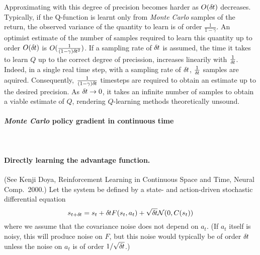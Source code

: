 Approximating with this degree of precision becomes harder as $O (\delta\hspace{-.06em}t)$
decreases. Typically, if the Q-function is learnt only from \emph{Monte Carlo} samples
of the return, the observed variance of the quantity to learn is of order
$\frac{1}{1 - \gamma}$. An optimist estimate of the number of
samples required to learn this quantity up to order $O (\delta\hspace{-.06em}t)$ is 
$O (\frac{1}{(1 - \gamma) \delta\hspace{-.06em}t^2})$. If a sampling rate of $\delta\hspace{-.06em}t$ is
assumed, the time it takes to learn $Q$ up to the correct degree of precission,
increases linearily with $\frac{1}{\delta\hspace{-.06em}t}$. Indeed, in a single real time step, with a
sampling rate of $\delta\hspace{-.06em}t$, $\frac{1}{\delta\hspace{-.06em}t}$ samples are aquired. Consequently,
$\frac{1}{(1 - \gamma) \delta\hspace{-.06em}t}$ timesteps are required to obtain an estimate up
to the desired precision. As $\delta\hspace{-.06em}t \to 0$, it takes an infinite number of samples
to obtain a viable estimate of $Q$, rendering $Q$-learning methods theoretically
unsound.

\paragraph{\emph{Monte Carlo} policy gradient in continuous time}~\\

\paragraph{Directly learning the advantage function.}
(See Kenji Doya, Reinforcement Learning in Continuous Space and Time,
Neural Comp.\ 2000.)
Let the system be defined by a state- and action-driven stochastic
differential equation
\begin{equation}
s_{t+\delta\hspace{-.06em}t}=s_t+\delta\hspace{-.06em}t F(s_t,a_t)+\sqrt{\delta\hspace{-.06em}t}\mathcal{N}(0,C(s_t))
\end{equation}
where we assume that the covariance noise does not depend on $a_t$. (If
$a_t$ itself is noisy, this will produce noise on $F$, but this noise
would typically be of order $\delta\hspace{-.06em}t$ unless the noise on $a_t$ is of
order $1/\sqrt{\delta\hspace{-.06em}t}$.)

